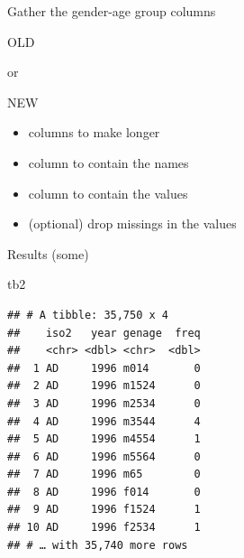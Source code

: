 \documentclass[
  ignorenonframetext,
]{beamer}
\newenvironment{Shaded}{\begin{snugshade}}{\end{snugshade}}
\newcommand{\DataTypeTok}[1]{\textcolor[rgb]{0.13,0.29,0.53}{#1}}
\newcommand{\KeywordTok}[1]{\textcolor[rgb]{0.13,0.29,0.53}{\textbf{#1}}}
\newcommand{\NormalTok}[1]{#1}
\newcommand{\OperatorTok}[1]{\textcolor[rgb]{0.81,0.36,0.00}{\textbf{#1}}}
\newcommand{\StringTok}[1]{\textcolor[rgb]{0.31,0.60,0.02}{#1}}
\providecommand{\tightlist}{%
  \setlength{\itemsep}{0pt}\setlength{\parskip}{0pt}}
\begin{document}
\begin{frame}[fragile]{Gather the gender-age group columns}
\protect\hypertarget{gather-the-gender-age-group-columns}{}

OLD

\begin{Shaded}
\end{Shaded}

or

NEW

\begin{Shaded}
\end{Shaded}

\begin{itemize}
\tightlist
\item
  columns to make longer
\item
  column to contain the names
\item
  column to contain the values
\item
  (optional) drop missings in the values
\end{itemize}

\end{frame}

\begin{frame}[fragile]{Results (some)}
\protect\hypertarget{results-some}{}

\begin{Shaded}
\begin{Highlighting}[]
\NormalTok{tb2}
\end{Highlighting}
\end{Shaded}

\begin{verbatim}
## # A tibble: 35,750 x 4
##    iso2   year genage  freq
##    <chr> <dbl> <chr>  <dbl>
##  1 AD     1996 m014       0
##  2 AD     1996 m1524      0
##  3 AD     1996 m2534      0
##  4 AD     1996 m3544      4
##  5 AD     1996 m4554      1
##  6 AD     1996 m5564      0
##  7 AD     1996 m65        0
##  8 AD     1996 f014       0
##  9 AD     1996 f1524      1
## 10 AD     1996 f2534      1
## # … with 35,740 more rows
\end{verbatim}

\end{frame}
\end{document}
